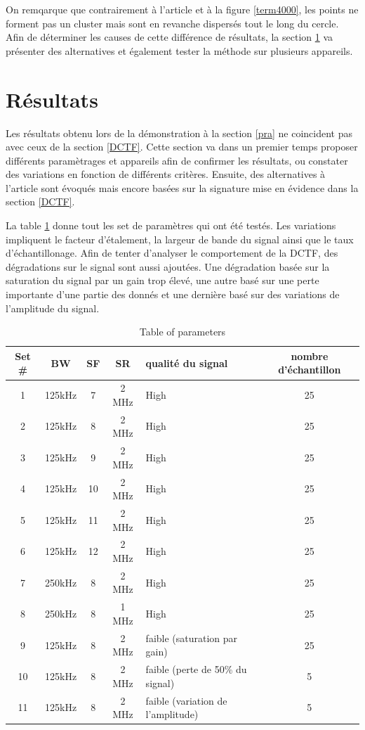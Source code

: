 On remqarque que contrairement à l'article et à la figure \ref{term4000}, les points ne forment pas un cluster mais sont en revanche dispersés tout le long du cercle. Afin de déterminer les causes de cette différence de résultats, la section \ref{result} va présenter des alternatives et également tester la méthode sur plusieurs appareils.

\section{Résultats}\label{result}

Les résultats obtenu lors de la démonstration à la section  \ref{pra} ne coincident pas avec ceux de la section \ref{DCTF}. Cette section va dans un premier temps proposer différents paramètrages et appareils afin de confirmer les résultats, ou constater des variations en fonction de différents critères. Ensuite, des alternatives à l'article sont évoqués mais encore basées sur la signature mise en évidence dans la section \ref{DCTF}.

La table \ref{set} donne tout les set de paramètres qui ont été testés. Les variations impliquent le facteur d'étalement, la largeur de bande du signal ainsi que le taux d'échantillonage. Afin de tenter d'analyser le comportement de la DCTF, des dégradations sur le signal sont aussi ajoutées. Une dégradation basée sur la saturation du signal par un gain trop élevé, une autre basé sur une perte importante d'une partie des donnés et une dernière basé sur des variations de l'amplitude du signal.

\begin{table}[h]
\centering
\begin{tabular}{|c|c|c|c|p{3cm}|c|}
\hline
Set \# & BW & SF & SR & qualité du signal & nombre d'échantillon\\
\hline
1  & 125kHz & 7 & 2 MHz & High & 25\\
\hline
2  & 125kHz & 8 & 2 MHz & High & 25\\
\hline
3  & 125kHz & 9 & 2 MHz & High & 25\\
\hline
4  & 125kHz & 10 & 2 MHz & High & 25\\
\hline
5  & 125kHz & 11 & 2 MHz & High & 25\\
\hline
6  & 125kHz & 12 & 2 MHz & High & 25\\
\hline
7  & 250kHz & 8 & 2 MHz & High & 25\\
\hline
8  & 250kHz & 8 & 1 MHz & High & 25\\
\hline
9  &  125kHz & 8 & 2 MHz & faible (saturation par gain) & 25\\
\hline
10  & 125kHz & 8 & 2 MHz & faible (perte de 50\% du signal) & 5\\
\hline
11  & 125kHz & 8 & 2 MHz & faible (variation de l'amplitude) & 5\\
\hline
\end{tabular}
\caption{Table of parameters}
\label{set}
\end{table}

